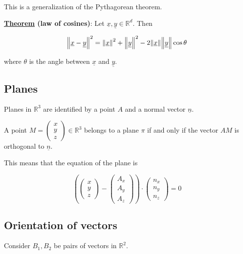 \documentclass[10pt]{extarticle}
\newcommand{\R}{\mathbb{R}}
\begin{document}
This is a generalization of the Pythagorean theorem.

\textbf{\underline{Theorem} (law of cosines)}: Let $\underline{x}, \underline{y} \in \R^d$. Then

$$
    \norm{\underline{x} - \underline{y}}^2 = \norm{\underline{x}}^2 + \norm{\underline{y}}^2 - 2 \norm{\underline{x}} \norm{\underline{y}} \cos \theta
$$

where $\theta$ is the angle between $\underline{x}$ and $\underline{y}$.

\subsection{Planes}

Planes in $\R^3$ are identified by a point $A$ and a normal vector $\underline{n}$.

A point $M = \begin{pmatrix}
        x \\ y \\ z
    \end{pmatrix} \in \R^3$ belongs to a plane $\pi$ if and only if the vector $AM$ is orthogonal to $\underline{n}$.

This means that the equation of the plane is

$$
    \left(
    \begin{pmatrix}
            x \\ y \\ z
        \end{pmatrix} - \begin{pmatrix}
            A_x \\ A_y \\ A_z
        \end{pmatrix}
    \right)
    \cdot
    \begin{pmatrix}
        n_x \\ n_y \\ n_z
    \end{pmatrix}
    = 0
$$

\subsection{Orientation of vectors}

Consider $B_1, B_2$ be pairs of vectors in $\R^2$.

\begin{center}

    \label{fig:orientation_of_vectors}
\end{center}
\end{document}
